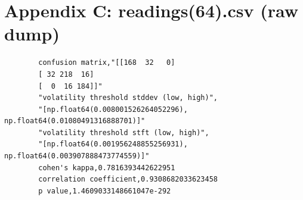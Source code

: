 \documentclass[12pt,letterpaper]{article}
\begin{document}
	\section{Appendix C: readings(64).csv (raw dump)}
	\begin{verbatim}
		confusion matrix,"[[168  32   0]
		[ 32 218  16]
		[  0  16 184]]"
		"volatility threshold stddev (low, high)",
		"[np.float64(0.008001526264052296), np.float64(0.01080491316888701)]"
		"volatility threshold stft (low, high)",
		"[np.float64(0.001956248855256931), np.float64(0.003907888473774559)]"
		cohen's kappa,0.7816393442622951
		correlation coefficient,0.9308682033623458
		p value,1.4609033148661047e-292
	\end{verbatim}
	
\end{document}
